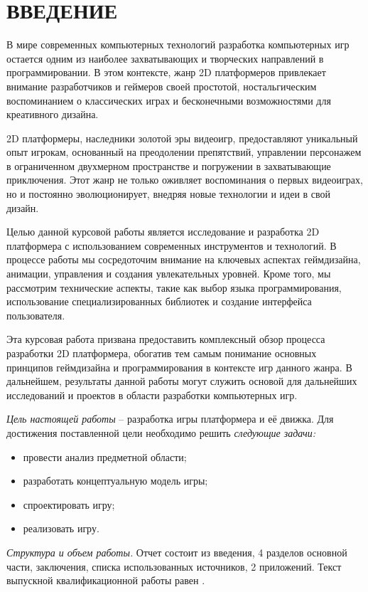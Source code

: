 \section*{ВВЕДЕНИЕ}

В мире современных компьютерных технологий разработка компьютерных игр остается одним из наиболее захватывающих и творческих направлений в программировании. В этом контексте, жанр 2D платформеров привлекает внимание разработчиков и геймеров своей простотой, ностальгическим воспоминанием о классических играх и бесконечными возможностями для креативного дизайна.

2D платформеры, наследники золотой эры видеоигр, предоставляют уникальный опыт игрокам, основанный на преодолении препятствий, управлении персонажем в ограниченном двухмерном пространстве и погружении в захватывающие приключения. Этот жанр не только оживляет воспоминания о первых видеоиграх, но и постоянно эволюционирует, внедряя новые технологии и идеи в свой дизайн.

Целью данной курсовой работы является исследование и разработка 2D платформера с использованием современных инструментов и технологий. В процессе работы мы сосредоточим внимание на ключевых аспектах геймдизайна, анимации, управления и создания увлекательных уровней. Кроме того, мы рассмотрим технические аспекты, такие как выбор языка программирования, использование специализированных библиотек и создание интерфейса пользователя.

Эта курсовая работа призвана предоставить комплексный обзор процесса разработки 2D платформера, обогатив тем самым понимание основных принципов геймдизайна и программирования в контексте игр данного жанра. В дальнейшем, результаты данной работы могут служить основой для дальнейших исследований и проектов в области разработки компьютерных игр.

\emph{Цель настоящей работы} – разработка игры платформера и её движка. Для достижения поставленной цели необходимо решить \emph{следующие задачи:}
\begin{itemize}
\item провести анализ предметной области;
\item разработать концептуальную модель игры;
\item спроектировать игру;
\item реализовать игру.
\end{itemize}

\emph{Структура и объем работы.} Отчет состоит из введения, 4 разделов основной части, заключения, списка использованных источников, 2 приложений. Текст выпускной квалификационной работы равен .

